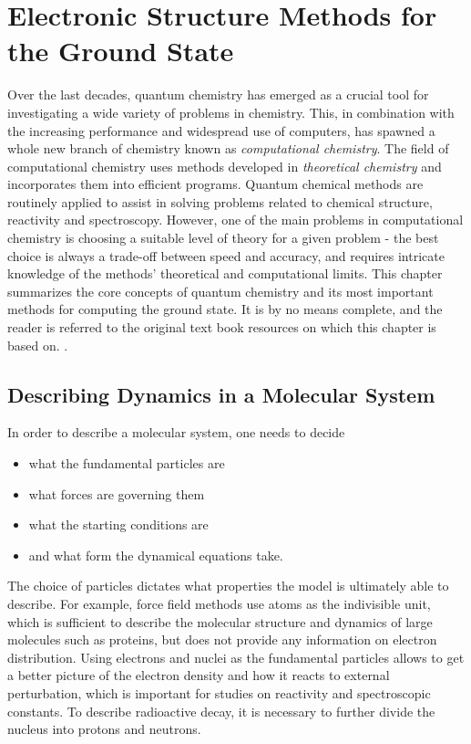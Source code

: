 \chapter{Electronic Structure Methods for the Ground State}

Over the last decades, quantum chemistry has emerged as a crucial tool for investigating a wide variety of problems in chemistry. This, in combination with the increasing performance and widespread use of computers, has spawned a whole new branch of chemistry known as \emph{computational chemistry}. The field of computational chemistry uses methods developed in \emph{theoretical chemistry} and incorporates them into efficient programs. Quantum chemical methods are routinely applied to assist in solving problems related to chemical structure, reactivity and spectroscopy. However, one of the main problems in computational chemistry is choosing a suitable level of theory for a given problem - the best choice is always a trade-off between speed and accuracy, and requires intricate knowledge of the methods' theoretical and computational limits. This chapter summarizes the core concepts of quantum chemistry and its most important methods for computing the ground state. It is by no means complete, and the reader is referred to the original text book resources on which this chapter is based on. \cite{Sza1996,Hel2000,Jen2017,Nor2018,Sch2018}.

\section{Describing Dynamics in a Molecular System}

In order to describe a molecular system, one needs to decide
\begin{itemize}
\item what the fundamental particles are
\item what forces are governing them
\item what the starting conditions are
\item and what form the dynamical equations take.
\end{itemize}
\noindent The choice of particles dictates what properties the model is ultimately able to describe. For example, force field methods use atoms as the indivisible unit, which is sufficient to describe the molecular structure and dynamics of large molecules such as proteins, but does not provide any information on electron distribution. Using electrons and nuclei as the fundamental particles allows to get a better picture of the electron density and how it reacts to external perturbation, which is important for studies on reactivity and spectroscopic constants. To describe radioactive decay, it is necessary to further divide the nucleus into protons and neutrons. 

